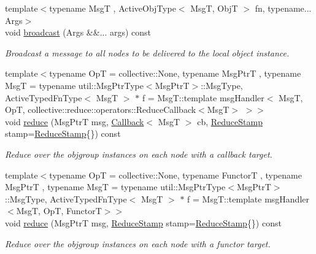 \begin{DoxyCompactItemize}
{\footnotesize template$<$typename MsgT , Active\+Obj\+Type$<$ Msg\+T, Obj\+T $>$ fn, typename... Args$>$ }\\void \hyperlink{structvt_1_1objgroup_1_1proxy_1_1_proxy_ad4f1ddeb5b09f01643b17a93bbbe82e9}{broadcast} (Args \&\&... args) const
\begin{DoxyCompactList}\small\item\em Broadcast a message to all nodes to be delivered to the local object instance. \end{DoxyCompactList}\item 
{\footnotesize template$<$typename OpT  = collective\+::\+None, typename Msg\+PtrT , typename MsgT  = typename util\+::\+Msg\+Ptr\+Type$<$\+Msg\+Ptr\+T$>$\+::\+Msg\+Type, Active\+Typed\+Fn\+Type$<$ Msg\+T $>$ $\ast$ f = Msg\+T\+::template msg\+Handler$<$      Msg\+T, Op\+T, collective\+::reduce\+::operators\+::\+Reduce\+Callback$<$\+Msg\+T$>$    $>$$>$ }\\void \hyperlink{structvt_1_1objgroup_1_1proxy_1_1_proxy_addf812b8ec24f570f3796c78adc7b18d}{reduce} (Msg\+PtrT msg, \hyperlink{namespacevt_a36db99df4c973d48b1118a293fff533f}{Callback}$<$ MsgT $>$ cb, \hyperlink{structvt_1_1objgroup_1_1proxy_1_1_proxy_a337be4c20cf11ff6477c7a66208cc909}{Reduce\+Stamp} stamp=\hyperlink{structvt_1_1objgroup_1_1proxy_1_1_proxy_a337be4c20cf11ff6477c7a66208cc909}{Reduce\+Stamp}\{\}) const
\begin{DoxyCompactList}\small\item\em Reduce over the objgroup instances on each node with a callback target. \end{DoxyCompactList}\item 
{\footnotesize template$<$typename OpT  = collective\+::\+None, typename FunctorT , typename Msg\+PtrT , typename MsgT  = typename util\+::\+Msg\+Ptr\+Type$<$\+Msg\+Ptr\+T$>$\+::\+Msg\+Type, Active\+Typed\+Fn\+Type$<$ Msg\+T $>$ $\ast$ f = Msg\+T\+::template msg\+Handler$<$\+Msg\+T, Op\+T, Functor\+T$>$$>$ }\\void \hyperlink{structvt_1_1objgroup_1_1proxy_1_1_proxy_a023cfc5be29752b2d91f8f0519c379b9}{reduce} (Msg\+PtrT msg, \hyperlink{structvt_1_1objgroup_1_1proxy_1_1_proxy_a337be4c20cf11ff6477c7a66208cc909}{Reduce\+Stamp} stamp=\hyperlink{structvt_1_1objgroup_1_1proxy_1_1_proxy_a337be4c20cf11ff6477c7a66208cc909}{Reduce\+Stamp}\{\}) const
\begin{DoxyCompactList}\small\item\em Reduce over the objgroup instances on each node with a functor target. \end{DoxyCompactList}\item 

\end{DoxyCompactItemize}

